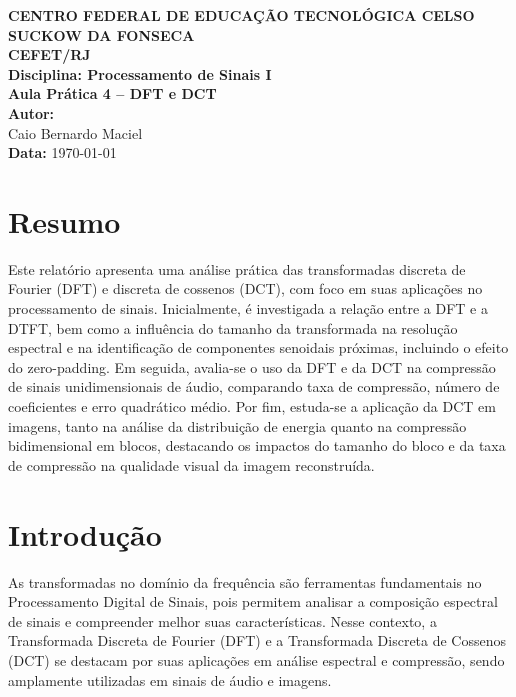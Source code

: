 \documentclass[12pt,a4paper]{article}
\begin{document}
\begin{center}
\textbf{CENTRO FEDERAL DE EDUCAÇÃO TECNOLÓGICA CELSO SUCKOW DA FONSECA}\\
\textbf{CEFET/RJ}\\[0.3cm]

\textbf{Disciplina: Processamento de Sinais I}\\
\textbf{Aula Prática 4 – DFT e DCT}\\[0.5cm]

\textbf{Autor:}\\
Caio Bernardo Maciel\\
[0.5cm]

\textbf{Data:} \today
\end{center}

\vspace{0.5cm}

\section*{Resumo}

Este relatório apresenta uma análise prática das transformadas discreta de Fourier (DFT) e discreta de cossenos (DCT), com foco em suas aplicações no processamento de sinais. Inicialmente, é investigada a relação entre a DFT e a DTFT, bem como a influência do tamanho da transformada na resolução espectral e na identificação de componentes senoidais próximas, incluindo o efeito do zero-padding. Em seguida, avalia-se o uso da DFT e da DCT na compressão de sinais unidimensionais de áudio, comparando taxa de compressão, número de coeficientes e erro quadrático médio. Por fim, estuda-se a aplicação da DCT em imagens, tanto na análise da distribuição de energia quanto na compressão bidimensional em blocos, destacando os impactos do tamanho do bloco e da taxa de compressão na qualidade visual da imagem reconstruída.

\section{Introdução}

As transformadas no domínio da frequência são ferramentas fundamentais no Processamento Digital de Sinais, pois permitem analisar a composição espectral de sinais e compreender melhor suas características. Nesse contexto, a Transformada Discreta de Fourier (DFT) e a Transformada Discreta de Cossenos (DCT) se destacam por suas aplicações em análise espectral e compressão, sendo amplamente utilizadas em sinais de áudio e imagens.\\\\
\end{document}
